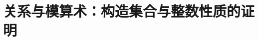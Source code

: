 \chapter[关系与模算术]{关系与模算术：构造集合与整数性质的证明}



\newpage


\newpage


\newpage


\newpage


\newpage


\newpage


\newpage

